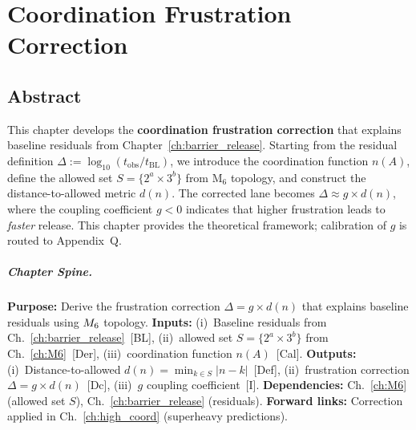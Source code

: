 
\chapter{Coordination Frustration Correction}
\label{ch:frustrated}


\section*{Abstract}

This chapter develops the \textbf{coordination frustration correction} that
explains baseline residuals from Chapter~\ref{ch:barrier_release}. Starting
from the residual definition $\Delta := \log_{10}(t_{\text{obs}}/t_{\text{BL}})$,
we introduce the coordination function $n(A)$, define the allowed set
$S = \{2^a \times 3^b\}$ from M$_6$ topology, and construct the distance-to-allowed
metric $d(n)$. The corrected lane becomes
$\Delta \approx g \times d(n)$, where the coupling coefficient $g < 0$ indicates
that higher frustration leads to \emph{faster} release. This chapter provides
the theoretical framework; calibration of $g$ is routed to Appendix~Q.

\paragraph{Chapter Spine.}
\textbf{Purpose:} Derive the frustration correction $\Delta = g \times d(n)$ that
explains baseline residuals using $M_6$ topology.
\textbf{Inputs:} (i)~Baseline residuals from Ch.~\ref{ch:barrier_release}~[BL],
(ii)~allowed set $S = \{2^a \times 3^b\}$ from Ch.~\ref{ch:M6}~[Der],
(iii)~coordination function $n(A)$~[Cal].
\textbf{Outputs:} (i)~Distance-to-allowed $d(n) = \min_{k \in S}|n-k|$~[Def],
(ii)~frustration correction $\Delta = g \times d(n)$~[Dc],
(iii)~$g$ coupling coefficient~[I].
\textbf{Dependencies:} Ch.~\ref{ch:M6} (allowed set $S$), Ch.~\ref{ch:barrier_release} (residuals).
\textbf{Forward links:} Correction applied in Ch.~\ref{ch:high_coord} (superheavy predictions).

